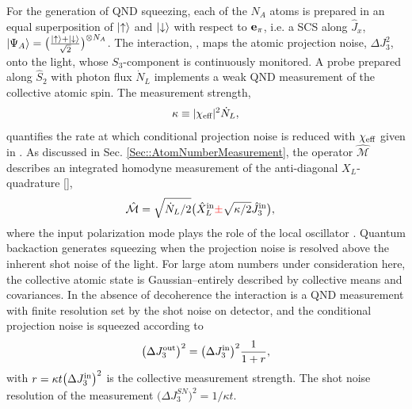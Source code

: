 \documentclass[preprint,aps,pra,onecolumn]{revtex4-1} %
\newcommand{\inp}{{\rm in}}
\newcommand{\out}{{\rm out}}
\newcommand{\error}[1]{{\color{red} #1}}
\begin{document}
For the generation of QND squeezing, each of the $N_A$ atoms is prepared in an equal superposition of $\lvert{\uparrow}\rangle$ and $\lvert{\downarrow}\rangle$ with respect to $\mathbf{e}_\pi$, i.e. a SCS along $\hat{J}_x$, $ \lvert{\Psi_A}\rangle = \big(\frac{\lvert{\uparrow}\rangle+\lvert{\downarrow}\rangle}{\sqrt{2}}\big) ^{\otimes N_A}$. The interaction, , maps the atomic projection noise, $\Delta J_3^2$, onto the light, whose $S_3$-component is continuously monitored. A probe prepared along $\hat{S}_2$ with photon flux $\dot{N}_L$  implements a weak QND measurement of the collective atomic spin. The measurement strength,
	\begin{align} \label{Eq::MeasurementStrength}
		\kappa \equiv |\chi_{\text{eff}}|^2 \dot{N}_L, 
	\end{align}
quantifies the rate at which conditional projection noise is reduced with $\chi_{\text{eff}}$ given in . As discussed in Sec. \ref{Sec::AtomNumberMeasurement}, the  operator $\hat{\mathcal{M}}$ describes an integrated homodyne measurement of the anti-diagonal $X_L$-quadrature [], 
	\begin{align} \label{Eq::OutputS3Squeeze}
		\hat{\mathcal{M}} & = \sqrt{\dot{N}_L/2} \big( \hat{X}_L^{\rm in} \error{\pm} \sqrt{\kappa/2} \hat{J}^\inp_3 \big),
	\end{align}
where the input polarization mode plays the role of the local oscillator  \cite{vasilyev_quantum_2012,baragiola_three-dimensional_2014}. Quantum backaction generates squeezing when the projection noise is resolved above the inherent shot noise of the light.  For large atom numbers under consideration here, the collective atomic state is Gaussian--entirely described by collective means and covariances.  In the absence of decoherence the interaction is a QND measurement with finite resolution set by the shot noise on detector, and the conditional projection noise is squeezed according to \cite{}
	\begin{align} \label{Eq::IdealSqueezing}
		\big(\Delta J_3^\out \big)^2 = \big( \Delta J_3^\inp \big)^2 \frac{1}{1+r},
	\end{align}
with $r = \kappa t \big( \Delta J_3^\inp \big)^2$ is the collective measurement strength.  The shot noise resolution of the measurement $\big(\Delta J^{SN}_3 \big)^2 =1/\kappa t$.  
\end{document}
